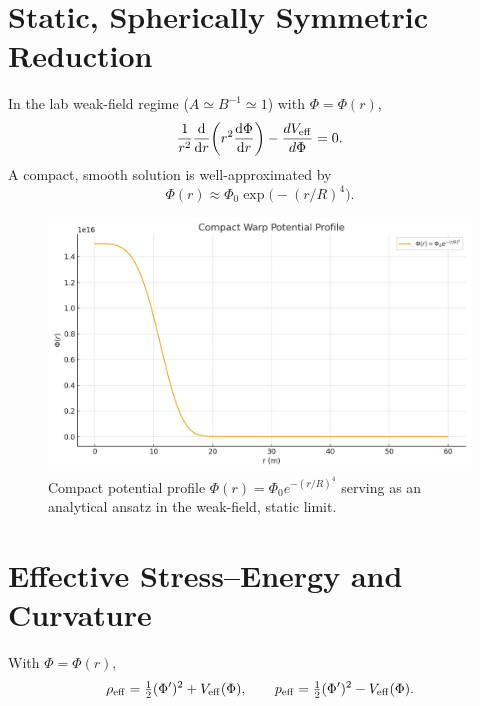 \documentclass[12pt]{article}
\begin{document}
\section{Static, Spherically Symmetric Reduction}
In the lab weak-field regime ($A\simeq B^{-1}\simeq 1$) with $\Phi=\Phi(r)$,
\begin{equation}
\frac{1}{r^2}\dv{r}\!\left(r^2 \dv{\Phi}{r}\right) - \frac{dV_{\rm eff}}{d\Phi}=0.
\end{equation}
A compact, smooth solution is well-approximated by
\begin{equation}
\Phi(r)\approx \Phi_0 \exp\!\big(-(r/R)^4\big).
\end{equation}

\begin{figure}[h]
  \centering
  \includegraphics[width=\linewidth]{figures/fig_phi_profile.png}
  \caption{Compact potential profile $\Phi(r)=\Phi_0 e^{-(r/R)^4}$ serving as an analytical ansatz in the weak-field, static limit.}
\end{figure}

\section{Effective Stress--Energy and Curvature}
With $\Phi=\Phi(r)$,
\begin{equation}
\rho_{\rm eff}=\tfrac{1}{2}(\Phi')^2+V_{\rm eff}(\Phi),\qquad p_{\rm eff}=\tfrac{1}{2}(\Phi')^2-V_{\rm eff}(\Phi).
\end{equation}
\end{document}
